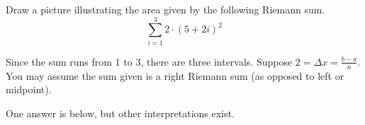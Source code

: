 \begin{question}\label{1.1RiemannInterp}
Draw a picture illustrating the area given by the following Riemann sum.
\[\sum_{i=1}^3 2\cdot\left(5+2i\right)^2 \]
\end{question}
\begin{hint}
Since the sum runs from 1 to 3, there are three intervals. Suppose $2 = \Delta x = \frac{b-a}{n}$. You may assume the sum given is a right Riemann sum (as opposed to left or midpoint).
\end{hint}
\begin{answer}
One answer is below, but other interpretations exist.


\begin{center}
\end{center}

\end{answer}
